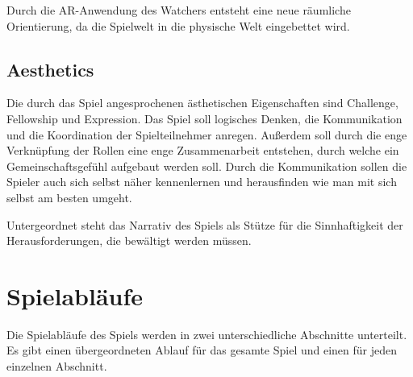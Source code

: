 Durch die AR-Anwendung des Watchers entsteht eine neue räumliche Orientierung, da die Spielwelt in die physische Welt eingebettet wird.


\subsection{Aesthetics}
Die durch das Spiel angesprochenen ästhetischen Eigenschaften sind Challenge, Fellowship und Expression. Das Spiel soll logisches Denken, die Kommunikation und die Koordination der Spielteilnehmer anregen. Außerdem soll durch die enge Verknüpfung der Rollen eine enge Zusammenarbeit entstehen, durch welche ein Gemeinschaftsgefühl aufgebaut werden soll. Durch die Kommunikation sollen die Spieler auch sich selbst näher kennenlernen und herausfinden wie man mit sich selbst am besten umgeht.

Untergeordnet steht das Narrativ des Spiels als Stütze für die Sinnhaftigkeit der Herausforderungen, die bewältigt werden müssen.


\section{Spielabläufe}
Die Spielabläufe des Spiels werden in zwei unterschiedliche Abschnitte unterteilt. Es gibt einen übergeordneten Ablauf für das gesamte Spiel und einen für jeden einzelnen Abschnitt.

